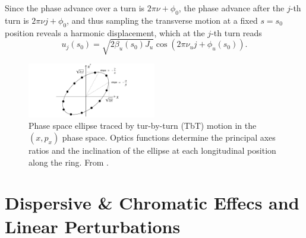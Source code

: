  Since the phase advance over a turn is $2\pi \nu+\phi_0$, the phase advance after the $j$-th turn is $2\pi\nu j+\phi_0$, and thus
 sampling the transverse motion at a fixed $s=s_0$ position reveals a harmonic displacement, which at the $j$-th turn reads
\begin{equation}
    u_j(s_0)=\sqrt{2\beta_u(s_0) J_u}\cos(2\pi\nu_u j+\phi_u(s_0)).
    \label{eq:TbT_motion}
\end{equation}
\begin{figure}[htb]
    \centering
    \includegraphics[width=0.5\textwidth]{Images/ellipse}
    \caption{Phase space ellipse traced by tur-by-turn (TbT) motion in the $(x,p_x)$ phase space. Optics functions determine the principal axes ratios and the inclination of the ellipse at each longitudinal position along the ring. From \cite{wolski_beam_2014}.}
    \label{ellipse}
\end{figure}
\section{Dispersive \& Chromatic Effecs and Linear Perturbations}
